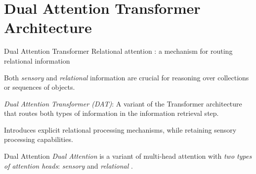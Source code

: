 \documentclass[xcolor={dvipsnames}]{beamer}
\newcommand{\senscolor}[1]{{\color{Maroon} #1 }}
\newcommand{\relcolor}[1]{{\color{RoyalBlue} #1 }}
\begin{document}
\section{Dual Attention Transformer Architecture}

\begin{frame}{Dual Attention Transformer}
    \relcolor{Relational attention}: a mechanism for routing relational information

    Both \senscolor{\emph{sensory}} and \emph{\relcolor{relational}} information are crucial for reasoning over collections or sequences of objects.

    \alert{\emph{Dual Attention Transformer (DAT)}}: A variant of the Transformer architecture that routes both types of information in the information retrieval step.

    Introduces explicit relational processing mechanisms, while retaining sensory processing capabilities.
\end{frame}

\begin{frame}{Dual Attention}
    \emph{\alert{Dual Attention}} is a variant of multi-head attention with \emph{\alert{two types of attention heads}}:  \senscolor{\emph{sensory}} and \emph{\relcolor{relational}}.
\end{frame}
\end{document}
